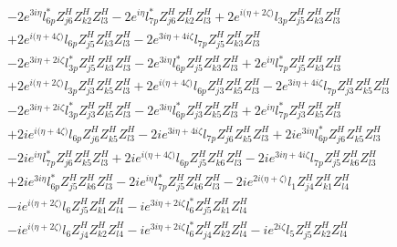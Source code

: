 \begin{align}
 &-2 e^{3 i \eta } l_{6p}^* Z_{{j 6}}^{H} Z_{{k 2}}^{H} Z_{{l 3}}^{H} -2 e^{i \eta } l_{7p}^* Z_{{j 6}}^{H} Z_{{k 2}}^{H} Z_{{l 3}}^{H} +2 e^{i \Big(\eta +2 \zeta \Big)} l_{3p} Z_{{j 5}}^{H} Z_{{k 3}}^{H} Z_{{l 3}}^{H} \nonumber \\ 
 &+2 e^{i \Big(\eta +4 \zeta \Big)} l_{6p} Z_{{j 5}}^{H} Z_{{k 3}}^{H} Z_{{l 3}}^{H} -2 e^{3 i \eta +4 i \zeta } l_{7p} Z_{{j 5}}^{H} Z_{{k 3}}^{H} Z_{{l 3}}^{H} \nonumber \\ 
 &-2 e^{3 i \eta +2 i \zeta } l_{3p}^* Z_{{j 5}}^{H} Z_{{k 3}}^{H} Z_{{l 3}}^{H} -2 e^{3 i \eta } l_{6p}^* Z_{{j 5}}^{H} Z_{{k 3}}^{H} Z_{{l 3}}^{H} +2 e^{i \eta } l_{7p}^* Z_{{j 5}}^{H} Z_{{k 3}}^{H} Z_{{l 3}}^{H} \nonumber \\ 
 &+2 e^{i \Big(\eta +2 \zeta \Big)} l_{3p} Z_{{j 3}}^{H} Z_{{k 5}}^{H} Z_{{l 3}}^{H} +2 e^{i \Big(\eta +4 \zeta \Big)} l_{6p} Z_{{j 3}}^{H} Z_{{k 5}}^{H} Z_{{l 3}}^{H} -2 e^{3 i \eta +4 i \zeta } l_{7p} Z_{{j 3}}^{H} Z_{{k 5}}^{H} Z_{{l 3}}^{H} \nonumber \\ 
 &-2 e^{3 i \eta +2 i \zeta } l_{3p}^* Z_{{j 3}}^{H} Z_{{k 5}}^{H} Z_{{l 3}}^{H} -2 e^{3 i \eta } l_{6p}^* Z_{{j 3}}^{H} Z_{{k 5}}^{H} Z_{{l 3}}^{H} +2 e^{i \eta } l_{7p}^* Z_{{j 3}}^{H} Z_{{k 5}}^{H} Z_{{l 3}}^{H} \nonumber \\ 
 &+2 i e^{i \Big(\eta +4 \zeta \Big)} l_{6p} Z_{{j 6}}^{H} Z_{{k 5}}^{H} Z_{{l 3}}^{H} -2 i e^{3 i \eta +4 i \zeta } l_{7p} Z_{{j 6}}^{H} Z_{{k 5}}^{H} Z_{{l 3}}^{H} +2 i e^{3 i \eta } l_{6p}^* Z_{{j 6}}^{H} Z_{{k 5}}^{H} Z_{{l 3}}^{H} \nonumber \\ 
 &-2 i e^{i \eta } l_{7p}^* Z_{{j 6}}^{H} Z_{{k 5}}^{H} Z_{{l 3}}^{H} +2 i e^{i \Big(\eta +4 \zeta \Big)} l_{6p} Z_{{j 5}}^{H} Z_{{k 6}}^{H} Z_{{l 3}}^{H} -2 i e^{3 i \eta +4 i \zeta } l_{7p} Z_{{j 5}}^{H} Z_{{k 6}}^{H} Z_{{l 3}}^{H} \nonumber \\ 
 &+2 i e^{3 i \eta } l_{6p}^* Z_{{j 5}}^{H} Z_{{k 6}}^{H} Z_{{l 3}}^{H} -2 i e^{i \eta } l_{7p}^* Z_{{j 5}}^{H} Z_{{k 6}}^{H} Z_{{l 3}}^{H} -2 i e^{2 i \Big(\eta +\zeta \Big)} l_1 Z_{{j 4}}^{H} Z_{{k 1}}^{H} Z_{{l 4}}^{H} \nonumber \\ 
 &-i e^{i \Big(\eta +2 \zeta \Big)} l_6 Z_{{j 5}}^{H} Z_{{k 1}}^{H} Z_{{l 4}}^{H} -i e^{3 i \eta +2 i \zeta } l_6^* Z_{{j 5}}^{H} Z_{{k 1}}^{H} Z_{{l 4}}^{H} \nonumber \\ 
 &-i e^{i \Big(\eta +2 \zeta \Big)} l_6 Z_{{j 4}}^{H} Z_{{k 2}}^{H} Z_{{l 4}}^{H} -i e^{3 i \eta +2 i \zeta } l_6^* Z_{{j 4}}^{H} Z_{{k 2}}^{H} Z_{{l 4}}^{H} -i e^{2 i \zeta } l_5 Z_{{j 5}}^{H} Z_{{k 2}}^{H} Z_{{l 4}}^{H} \nonumber \\ 

\end{align}
